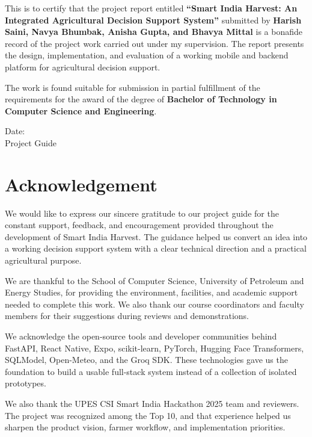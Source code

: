 \documentclass[12pt,a4paper]{report}
\newcommand{\ProjectName}{Smart India Harvest}
\begin{document}
This is to certify that the project report entitled \textbf{``Smart India Harvest: An Integrated Agricultural Decision Support System''} submitted by \textbf{Harish Saini, Navya Bhumbak, Anisha Gupta, and Bhavya Mittal} is a bonafide record of the project work carried out under my supervision. The report presents the design, implementation, and evaluation of a working mobile and backend platform for agricultural decision support.

The work is found suitable for submission in partial fulfillment of the requirements for the award of the degree of \textbf{Bachelor of Technology in Computer Science and Engineering}.

\vspace{2.3cm}

\noindent Date: \underline{\hspace{3cm}} \hfill \textbf{\underline{\hspace{5cm}}}\\
\hfill Project Guide

\singlespacing

\chapter*{Acknowledgement}
\thispagestyle{fancy}
\doublespacing

We would like to express our sincere gratitude to our project guide for the constant support, feedback, and encouragement provided throughout the development of \ProjectName. The guidance helped us convert an idea into a working decision support system with a clear technical direction and a practical agricultural purpose.

We are thankful to the School of Computer Science, University of Petroleum and Energy Studies, for providing the environment, facilities, and academic support needed to complete this work. We also thank our course coordinators and faculty members for their suggestions during reviews and demonstrations.

We acknowledge the open-source tools and developer communities behind FastAPI, React Native, Expo, scikit-learn, PyTorch, Hugging Face Transformers, SQLModel, Open-Meteo, and the Groq SDK. These technologies gave us the foundation to build a usable full-stack system instead of a collection of isolated prototypes.

We also thank the UPES CSI Smart India Hackathon 2025 team and reviewers. The project was recognized among the Top 10, and that experience helped us sharpen the product vision, farmer workflow, and implementation priorities.
\end{document}
